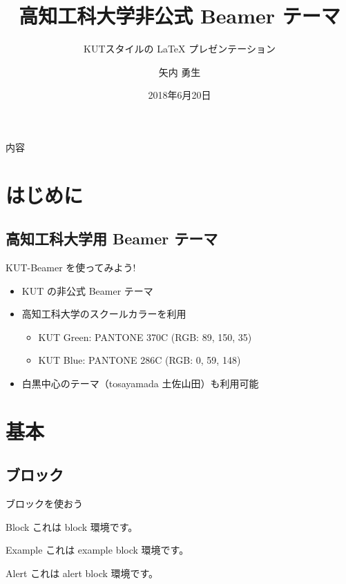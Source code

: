 \documentclass[dvipdfmx]{beamer}
\title[KUT-Beamer]{高知工科大学非公式 Beamer テーマ}
\subtitle{KUTスタイルの {\LaTeX} プレゼンテーション}
\author{矢内 勇生}
\institute[KUT]{経済・マネジメント学群}
\date{2018年6月20日}
\begin{document}
\begin{frame}
 \maketitle
\end{frame}

\begin{frame}{内容} 
  \tableofcontents
\end{frame}

\section{はじめに}
\subsection{高知工科大学用 Beamer テーマ}

\begin{frame}{KUT-Beamer を使ってみよう!}
 \begin{itemize}
  \item KUT の\alert{非公式} Beamer テーマ
  \item 高知工科大学のスクールカラーを利用
  \begin{itemize}
   \item \textcolor{kutgreen}{KUT Green}: PANTONE 370C (RGB: 89, 150, 35)
   \item \textcolor{kutblue}{KUT Blue}: PANTONE 286C (RGB: 0, 59, 148) 
  \end{itemize}
  \item 白黒中心のテーマ（tosayamada 土佐山田）も利用可能
 \end{itemize}
\end{frame}



\section{基本}


\subsection{ブロック}

\begin{frame}{ブロックを使おう}
  \begin{block}{Block}
   これは block 環境です。
  \end{block}
  \pause
  \begin{exampleblock}{Example}
   これは example block 環境です。 
  \end{exampleblock}
 \pause
  \begin{alertblock}{Alert}
   これは alert block 環境です。
  \end{alertblock}
\end{frame}
\end{document}
